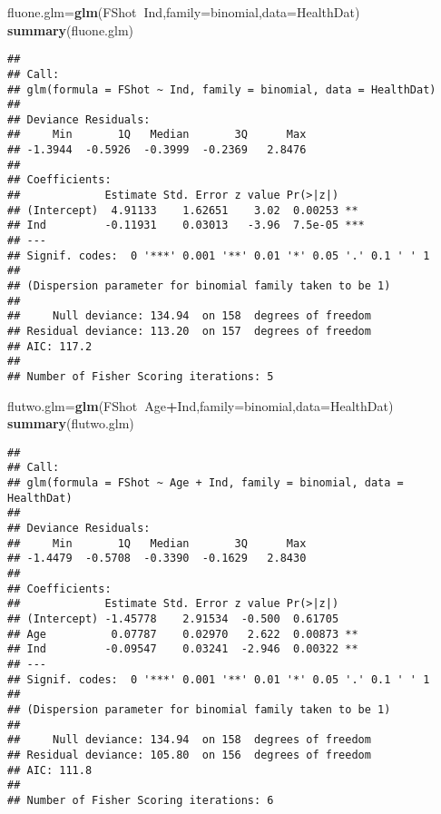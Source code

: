 \documentclass[]{article}
\newenvironment{Shaded}{\begin{snugshade}}{\end{snugshade}}
\newcommand{\KeywordTok}[1]{\textcolor[rgb]{0.13,0.29,0.53}{\textbf{#1}}}
\newcommand{\DataTypeTok}[1]{\textcolor[rgb]{0.13,0.29,0.53}{#1}}
\newcommand{\OperatorTok}[1]{\textcolor[rgb]{0.81,0.36,0.00}{\textbf{#1}}}
\newcommand{\NormalTok}[1]{#1}
\begin{document}
\begin{Shaded}
\begin{Highlighting}[]
\NormalTok{fluone.glm=}\KeywordTok{glm}\NormalTok{(FShot}\OperatorTok{~}\NormalTok{Ind,}\DataTypeTok{family=}\NormalTok{binomial,}\DataTypeTok{data=}\NormalTok{HealthDat)}
\KeywordTok{summary}\NormalTok{(fluone.glm)}
\end{Highlighting}
\end{Shaded}

\begin{verbatim}
## 
## Call:
## glm(formula = FShot ~ Ind, family = binomial, data = HealthDat)
## 
## Deviance Residuals: 
##     Min       1Q   Median       3Q      Max  
## -1.3944  -0.5926  -0.3999  -0.2369   2.8476  
## 
## Coefficients:
##             Estimate Std. Error z value Pr(>|z|)    
## (Intercept)  4.91133    1.62651    3.02  0.00253 ** 
## Ind         -0.11931    0.03013   -3.96  7.5e-05 ***
## ---
## Signif. codes:  0 '***' 0.001 '**' 0.01 '*' 0.05 '.' 0.1 ' ' 1
## 
## (Dispersion parameter for binomial family taken to be 1)
## 
##     Null deviance: 134.94  on 158  degrees of freedom
## Residual deviance: 113.20  on 157  degrees of freedom
## AIC: 117.2
## 
## Number of Fisher Scoring iterations: 5
\end{verbatim}

\begin{Shaded}
\begin{Highlighting}[]
\NormalTok{flutwo.glm=}\KeywordTok{glm}\NormalTok{(FShot}\OperatorTok{~}\NormalTok{Age}\OperatorTok{+}\NormalTok{Ind,}\DataTypeTok{family=}\NormalTok{binomial,}\DataTypeTok{data=}\NormalTok{HealthDat)}
\KeywordTok{summary}\NormalTok{(flutwo.glm)}
\end{Highlighting}
\end{Shaded}

\begin{verbatim}
## 
## Call:
## glm(formula = FShot ~ Age + Ind, family = binomial, data = HealthDat)
## 
## Deviance Residuals: 
##     Min       1Q   Median       3Q      Max  
## -1.4479  -0.5708  -0.3390  -0.1629   2.8430  
## 
## Coefficients:
##             Estimate Std. Error z value Pr(>|z|)   
## (Intercept) -1.45778    2.91534  -0.500  0.61705   
## Age          0.07787    0.02970   2.622  0.00873 **
## Ind         -0.09547    0.03241  -2.946  0.00322 **
## ---
## Signif. codes:  0 '***' 0.001 '**' 0.01 '*' 0.05 '.' 0.1 ' ' 1
## 
## (Dispersion parameter for binomial family taken to be 1)
## 
##     Null deviance: 134.94  on 158  degrees of freedom
## Residual deviance: 105.80  on 156  degrees of freedom
## AIC: 111.8
## 
## Number of Fisher Scoring iterations: 6
\end{verbatim}
\end{document}
